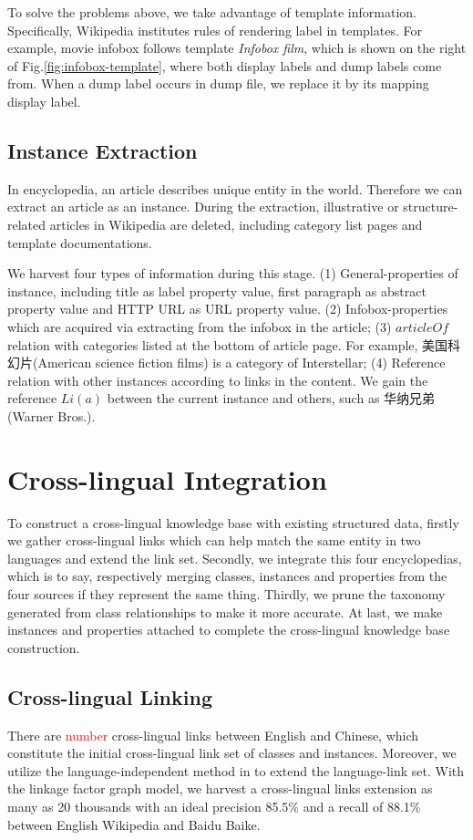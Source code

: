 \documentclass[runningheads,a4paper]{llncs}
\begin{document}
To solve the problems above, we take advantage of template information. Specifically, Wikipedia institutes rules of rendering label in templates. For example, movie infobox follows template \emph{Infobox film}, which is shown on the right of Fig.\ref{fig:infobox-template}, where both display labels and dump labels come from. When a dump label occurs in dump file, we replace it by its mapping display label. 

\subsection{Instance Extraction}
\label{sec:ie}
In encyclopedia, an article describes unique entity in the world. Therefore we can extract an article as an instance. During the extraction, illustrative or structure-related articles in Wikipedia are deleted, including category list pages and template documentations.

We harvest four types of information during this stage. (1) General-properties of instance, including title as label property value, first paragraph as abstract property value and HTTP URL as URL property value. (2) Infobox-properties which are acquired via extracting from the infobox in the article; (3) $articleOf$ relation with categories listed at the bottom of article page. For example, 美国科幻片(American science fiction films) is a category of Interstellar; (4) Reference relation with other instances according to links in the content. We gain the reference $Li(a)$ between the current instance and others, such as 华纳兄弟(Warner Bros.).

\section{Cross-lingual Integration}
\label{sec:clkbb}
To construct a cross-lingual knowledge base with existing structured data, firstly we gather cross-lingual links which can help match the same entity in two languages and extend the link set. Secondly, we integrate this four encyclopedias, which is to say, respectively merging classes, instances and properties from the four sources if they represent the same thing. Thirdly, we prune the taxonomy generated from class relationships to make it more accurate. At last, we make instances and properties attached to complete the cross-lingual knowledge base construction. 

\subsection{Cross-lingual Linking}
There are \textcolor{red}{number} cross-lingual links between English and Chinese, which constitute the initial cross-lingual link set of classes and instances. Moreover, we utilize the language-independent method in \cite{wang2012cross} to extend the language-link set. With the linkage factor graph model, we harvest a cross-lingual links extension as many as 20 thousands with an ideal precision 85.5\% and a recall of 88.1\% between English Wikipedia and Baidu Baike.
\end{document}
